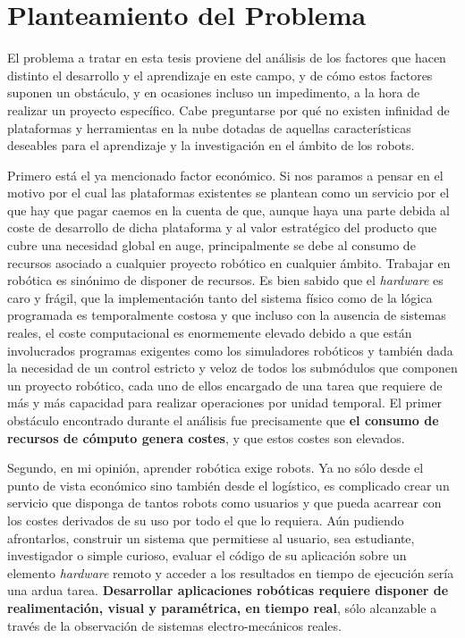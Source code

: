 \section{Planteamiento del Problema}

El problema a tratar en esta tesis proviene del análisis de los factores que hacen distinto el desarrollo y el aprendizaje en este campo, y de cómo estos factores suponen un obstáculo, y en ocasiones incluso un impedimento, a la hora de realizar un proyecto específico. Cabe preguntarse por qué no existen infinidad de plataformas y herramientas en la nube dotadas de aquellas características deseables para el aprendizaje y la investigación en el ámbito de los robots. 

Primero está el ya mencionado factor económico. Si nos paramos a pensar en el motivo por el cual las plataformas existentes se plantean como un servicio por el que hay que pagar caemos en la cuenta de que, aunque haya una parte debida al coste de desarrollo de dicha plataforma y al valor estratégico del producto que cubre una necesidad global en auge, principalmente se debe al consumo de recursos asociado a cualquier proyecto robótico en cualquier ámbito. Trabajar en robótica es sinónimo de disponer de recursos. Es bien sabido que el \textit{hardware} es caro y frágil, que la implementación tanto del sistema físico como de la lógica programada es temporalmente costosa y que incluso con la ausencia de sistemas reales, el coste computacional es enormemente elevado debido a que están involucrados programas exigentes como los simuladores robóticos y también dada la necesidad de un control estricto y veloz de todos los submódulos que componen un proyecto robótico, cada uno de ellos encargado de una tarea que requiere de más y más capacidad para realizar operaciones por unidad temporal. El primer obstáculo encontrado durante el análisis fue precisamente que \textbf{el consumo de recursos de cómputo genera costes}, y que estos costes son elevados.

Segundo, en mi opinión, aprender robótica exige robots. Ya no sólo desde el punto de vista económico sino también desde el logístico, es complicado crear un servicio que disponga de tantos robots como usuarios y que pueda acarrear con los costes derivados de su uso por todo el que lo requiera. Aún pudiendo afrontarlos, construir un sistema que permitiese al usuario, sea estudiante, investigador o simple curioso, evaluar el código de su aplicación sobre un elemento \textit{hardware} remoto y acceder a los resultados en tiempo de ejecución sería una ardua tarea. \textbf{Desarrollar aplicaciones robóticas requiere disponer de realimentación, visual y paramétrica, en tiempo real}, sólo alcanzable a través de la observación de sistemas electro-mecánicos reales.

